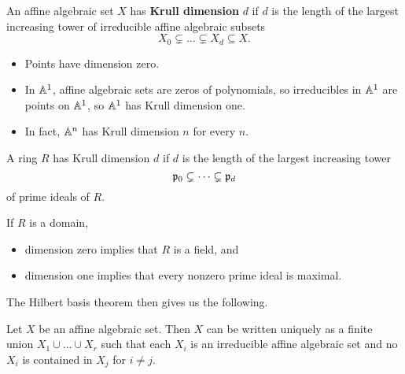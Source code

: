 \pagebreak

\begin{definition}
An affine algebraic set $ X $ has \textbf{Krull dimension} $ d $ if $ d $ is the length of the largest increasing tower of irreducible affine algebraic subsets
$$ X_0 \subsetneq \dots \subsetneq X_d \subseteq X. $$
\end{definition}

\begin{example*}
\hfill
\begin{itemize}
\item Points have dimension zero.
\item In $ \mathbb{A}^1 $, affine algebraic sets are zeros of polynomials, so irreducibles in $ \mathbb{A}^1 $ are points on $ \mathbb{A}^1 $, so $ \mathbb{A}^1 $ has Krull dimension one.
\item In fact, $ \mathbb{A}^n $ has Krull dimension $ n $ for every $ n $.
\end{itemize}
\end{example*}

\begin{definition}
A ring $ R $ has Krull dimension $ d $ if $ d $ is the length of the largest increasing tower
$$ \mathfrak{p}_0 \subsetneq \dots \subsetneq \mathfrak{p}_d $$
of prime ideals of $ R $.
\end{definition}

\begin{example*}
If $ R $ is a domain,
\begin{itemize}
\item dimension zero implies that $ R $ is a field, and
\item dimension one implies that every nonzero prime ideal is maximal.
\end{itemize}
\end{example*}

The Hilbert basis theorem then gives us the following.

\begin{proposition}
Let $ X $ be an affine algebraic set. Then $ X $ can be written uniquely as a finite union $ X_1 \cup \dots \cup X_r $ such that each $ X_i $ is an irreducible affine algebraic set and no $ X_i $ is contained in $ X_j $ for $ i \ne j $.
\end{proposition}

